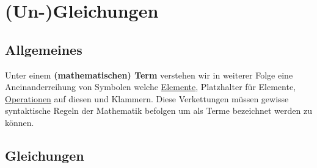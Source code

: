\documentclass[../../main.tex]{subfiles}
\begin{document}
	
	\chapter{(Un-)Gleichungen}
	
	\section{Allgemeines}
	
	\begin{definition}
		\label{def:MathematischerTerm}
		Unter einem \textbf{(mathematischen) Term} verstehen wir in weiterer Folge eine Aneinanderreihung von Symbolen welche \hyperref[def:Element]{Elemente}, Platzhalter für Elemente, \hyperref[def:Operation]{Operationen} auf diesen und Klammern. Diese Verkettungen müssen gewisse syntaktische Regeln der Mathematik befolgen  um als Terme bezeichnet werden zu können.	
	\end{definition}

	\section{Gleichungen}
	
\end{document}
